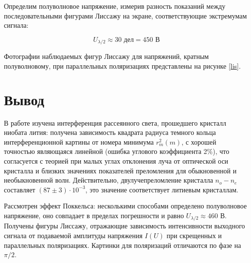 \documentclass[a4paper, 12pt]{article}%
\begin{document}
	Определим полуволновое напряжение, измерив разность показаний между последовательными фигурами Лиссажу на экране, соответствующие экстремумам сигнала: 
	
	\[ U_{\lambda/2} \approx 30 \text{ дел} = 450 \text{ В} \]
	
	Фотографии наблюдаемых фигур Лиссажу для напряжений, кратным полуволновому, при параллельных поляризациях представлены на рисунке \ref{lis}.
	
	\section{Вывод}
	
	В работе изучена интерференция рассеянного света, прошедшего кристалл ниобата лития: получена зависимость квадрата радиуса темного кольца интерференционной картины от номера минимума $r_m^2(m)$, с хорошей точностью являющаяся линейной (ошибка углового коэффициента 2\%), что согласуется с теорией при малых углах отклонения луча от оптической оси кристалла и близких значениях показателей преломления для обыкновенной и необыкновенной волн. Действительно, двулучепреломление кристалла $n_o - n_e$ составляет $(87 \pm 3)\cdot10^{-3}$, это значение соответствует литиевым кристаллам. 
	
	Рассмотрен эффект Поккельса: несколькими способами определено полуволновое напряжение, оно совпадает в пределах погрешности и равно $U_{\lambda/2} \approx 460$ В. Получены фигуры Лиссажу, отражающие зависимость интенсивности выходного сигнала от подаваемой амплитуды напряжения $I(U)$ при скрещенных и параллельных поляризациях. Картинки для поляризаций отличаются по фазе на $\pi/2$.
	
\end{document}
